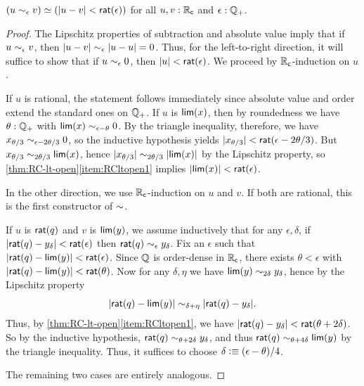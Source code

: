 \begin{thm} \label{RC-sim-eqv-le}
  $(u \sim_{\epsilon} v) \simeq (|u - v| < \mathsf{rat}(\epsilon))$
  for all $u, v : \mathbb{R}_\mathsf{c}$ and $\epsilon : \mathbb{Q}_{+}$.
\end{thm}
\begin{proof}
  The Lipschitz properties of subtraction and absolute value imply that if $u\sim_{\epsilon} v$, then $|u-v| \sim_{\epsilon} |u-u| = 0$.
  Thus, for the left-to-right direction, it will suffice to show that if $u\sim_{\epsilon} 0$, then $|u|<\mathsf{rat}(\epsilon)$.
  We proceed by $\mathbb{R}_\mathsf{c}$-induction on $u$.

  If $u$ is rational, the statement follows immediately since absolute value and order extend the standard ones on $\mathbb{Q}_{+}$.
  If $u$ is $\mathsf{lim}(x)$, then by roundedness we have $\theta:\mathbb{Q}_{+}$ with $\mathsf{lim}(x)\sim_{\epsilon-\theta} 0$.
  By the triangle inequality, therefore, we have $x_{\theta/3} \sim_{\epsilon-2\theta/3} 0$, so the inductive hypothesis yields $|x_{\theta/3}|<\mathsf{rat}(\epsilon-2\theta/3)$.
  But $x_{\theta/3} \sim_{2\theta/3} \mathsf{lim}(x)$, hence $|x_{\theta/3}| \sim_{2\theta/3} |\mathsf{lim}(x)|$ by the Lipschitz property, so \cref{thm:RC-lt-open}\ref{item:RCltopen1} implies $|\mathsf{lim}(x)|<\mathsf{rat}(\epsilon)$.

  In the other direction, we use $\mathbb{R}_\mathsf{c}$-induction on $u$ and $v$.
  If both are rational, this is the first constructor of $\mathord\sim$.

  If $u$ is $\mathsf{rat}(q)$ and $v$ is $\mathsf{lim}(y)$, we assume inductively that for any $\epsilon,\delta$, if $|\mathsf{rat}(q)-y_\delta|<\mathsf{rat}(\epsilon)$ then $\mathsf{rat}(q) \sim_{\epsilon} y_\delta$.
  Fix an $\epsilon$ such that $|\mathsf{rat}(q) - \mathsf{lim}(y)|<\mathsf{rat}(\epsilon)$.
  Since $\mathbb{Q}$ is order-dense in $\mathbb{R}_\mathsf{c}$, there exists $\theta<\epsilon$ with $|\mathsf{rat}(q) - \mathsf{lim}(y)|<\mathsf{rat}(\theta)$.
  Now for any $\delta,\eta$ we have $\mathsf{lim}(y)\sim_{2\delta} y_\delta$, hence by the Lipschitz property
  \[ |\mathsf{rat}(q) - \mathsf{lim}(y)| \sim_{\delta+\eta} |\mathsf{rat}(q) - y_\delta|. \]
  Thus, by \cref{thm:RC-lt-open}\ref{item:RCltopen1}, we have $|\mathsf{rat}(q) - y_\delta| < \mathsf{rat}(\theta+2\delta)$.
  So by the inductive hypothesis, $\mathsf{rat}(q) \sim_{\theta+2\delta} y_\delta$, and thus $\mathsf{rat}(q)\sim_{\theta+4\delta} \mathsf{lim}(y)$ by the triangle inequality.
  Thus, it suffices to choose $\delta \vcentcolon\equiv (\epsilon-\theta)/4$.

  The remaining two cases are entirely analogous.
\end{proof}

